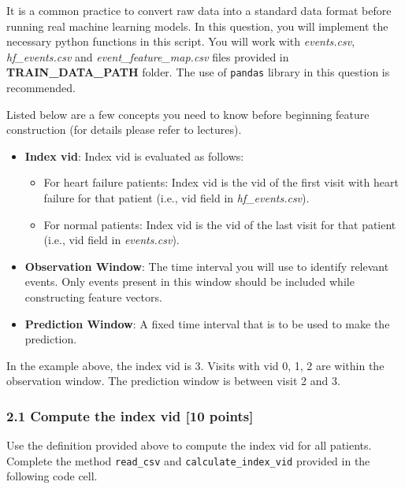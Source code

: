 \documentclass[11pt]{article}
\providecommand{\tightlist}{%
      \setlength{\itemsep}{0pt}\setlength{\parskip}{0pt}}
\begin{document}
It is a common practice to convert raw data into a standard data format
before running real machine learning models. In this question, you will
implement the necessary python functions in this script. You will work
with \emph{events.csv}, \emph{hf\_events.csv} and
\emph{event\_feature\_map.csv} files provided in
\textbf{TRAIN\_DATA\_PATH} folder. The use of \texttt{pandas} library in
this question is recommended.

Listed below are a few concepts you need to know before beginning
feature construction (for details please refer to lectures).

\begin{itemize}
\tightlist
\item
  \textbf{Index vid}: Index vid is evaluated as follows:

  \begin{itemize}
  \tightlist
  \item
    For heart failure patients: Index vid is the vid of the first visit
    with heart failure for that patient (i.e., vid field in
    \emph{hf\_events.csv}).
  \item
    For normal patients: Index vid is the vid of the last visit for that
    patient (i.e., vid field in \emph{events.csv}).
  \end{itemize}
\item
  \textbf{Observation Window}: The time interval you will use to
  identify relevant events. Only events present in this window should be
  included while constructing feature vectors.
\item
  \textbf{Prediction Window}: A fixed time interval that is to be used
  to make the prediction.
\end{itemize}

In the example above, the index vid is 3. Visits with vid 0, 1, 2 are
within the observation window. The prediction window is between visit 2
and 3.

    \hypertarget{compute-the-index-vid-10-points}{%
\subsubsection{2.1 Compute the index vid {[}10
points{]}}\label{compute-the-index-vid-10-points}}

Use the definition provided above to compute the index vid for all
patients. Complete the method \texttt{read\_csv} and
\texttt{calculate\_index\_vid} provided in the following code cell.
\end{document}
